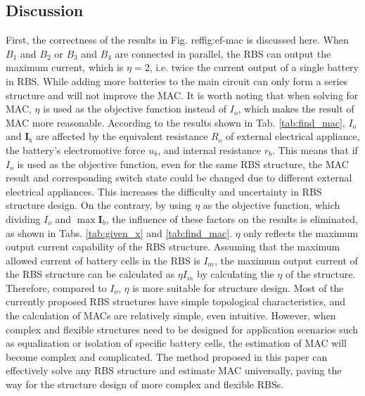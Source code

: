 \documentclass{article}
\begin{document}
\subsection{Discussion}

First, the correctness of the results in Fig. ref{fig:ef-mac} is discussed here.
When $B_1$ and $B_2$ or $B_3$ and $B_4$ are connected in parallel, the RBS can output the maximum current, which is $\eta=2$, i.e. twice the current output of a single battery in RBS.
While adding more batteries to the main circuit can only form a series structure and will not improve the MAC.
It is worth noting that when solving for MAC, $\eta$ is used as the objective function instead of $I_o$, which makes the result of MAC more reasonable. 
According to the results shown in Tab. \ref{tab:find_mac}, $I_o$ and $\bm{I}_b$ are affected by the equivalent resistance $R_o$ of external electrical appliance, the battery's electromotive force $u_b$, and internal resistance $r_b$. %
This means that if $I_o$ is used as the objective function, even for the same RBS structure, the MAC result and corresponding switch state could be changed due to different external electrical appliances. 
This increases the difficulty and uncertainty in RBS structure design. 
On the contrary, by using $\eta$ as the objective function, which dividing $I_o$ and $\max\bm{I}_b$, the influence of these factors on the results is eliminated, as shown in Tabs. \ref{tab:given_x} and \ref{tab:find_mac}.
$\eta$ only reflects the maximum output current capability of the RBS structure.
Assuming that the maximum allowed current of battery cells in the RBS is $I_m$, the maximum output current of the RBS structure can be calculated as $\eta I_m$ by calculating the $\eta$ of the structure. 
Therefore, compared to $I_o$, $\eta$ is more suitable for structure design. 
Most of the currently proposed RBS structures\cite{ciNovelDesignAdaptive2007,alahmadBatterySwitchArray2008,kimDependableEfficientScalable2010b,kimBalancedReconfigurationStorage2011a,taesickimSeriesconnectedSelfreconfigurableMulticell2012a,6843711} have simple topological characteristics, and the calculation of MACs are relatively simple, even intuitive. %
However, when complex and flexible structures need to be designed for application scenarios such as equalization or isolation of specific battery cells, the estimation of MAC will become complex and complicated. 
The method proposed in this paper can effectively solve any RBS structure and estimate MAC universally, paving the way for the structure design of more complex and flexible RBSs.
\end{document}
